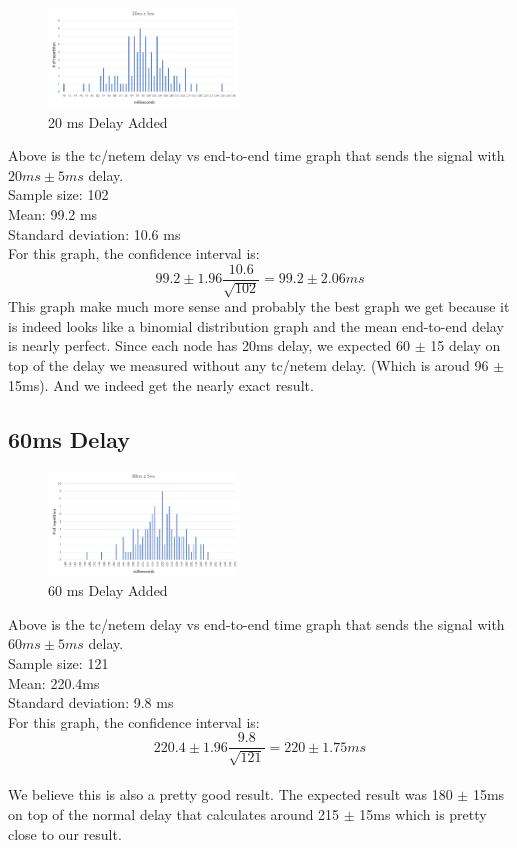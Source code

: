 \documentclass[conference]{IEEEtran}
\begin{document}
\begin{figure}[h]
\includegraphics[width=0.45\textwidth]{20_ms.png}
\caption{20 ms Delay Added}
\label{fig:figure2}
\end{figure}
Above is the tc/netem delay vs end-to-end time graph that sends the signal with $20ms \pm 5ms$ delay. \\
Sample size: 102 \\
Mean: 99.2 ms \\
Standard deviation: 10.6 ms \\
For this graph, the confidence interval is:
$$99.2 \pm 1.96 \dfrac{10.6}{\sqrt{102}} = 99.2 \pm 2.06ms$$
This graph make much more sense and probably the best graph we get because it is indeed looks like a binomial distribution graph and the mean end-to-end delay is nearly perfect. Since each node has 20ms delay, we expected 60 $\pm$ 15 delay on top of the delay we measured without any tc/netem delay. (Which is aroud 96 $\pm$ 15ms). And we indeed get the nearly exact result.
\subsection{60ms Delay}

\begin{figure}[h]
\includegraphics[width=0.45\textwidth]{ms.png}
\caption{60 ms Delay Added}
\label{fig:figure2}
\end{figure}
Above is the tc/netem delay vs end-to-end time graph that sends the signal with $60ms \pm 5ms$ delay. \\
Sample size: 121 \\
Mean: 220.4ms \\
Standard deviation: 9.8 ms \\
For this graph, the confidence interval is:
$$220.4 \pm 1.96 \dfrac{9.8}{\sqrt{121}} = 220 \pm 1.75ms$$ \\
We believe this is also a pretty good result. The expected result was 180 $\pm$ 15ms on top of the normal delay that calculates around 215 $\pm$ 15ms which is pretty close to our result.
\end{document}
